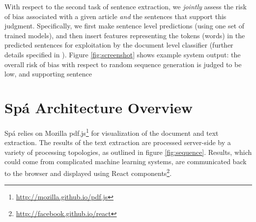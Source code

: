 \documentclass[runningheads,a4paper]{llncs}
\begin{document}
With respect to the second task of sentence extraction, we \emph{jointly} assess the risk of bias associated with a given article \emph{and} the sentences that support this judgment.
Specifically, we first make sentence level predictions (using one set of trained models), and then insert features representing the tokens (words) in the predicted sentences for exploitation by the document level classifier (further details specified in \cite{marshall2014}).
Figure \ref{fig:screenshot} shows example system output: the overall risk of bias with respect to random sequence generation is judged to be low, and supporting sentence



\section{Spá Architecture Overview}
Spá relies on Mozilla pdf.js\footnote{\url{http://mozilla.github.io/pdf.js}} for visualization of the document and text extraction.
The results of the text extraction are processed server-side by a variety of processing topologies, as outlined in figure \ref{fig:sequence}.
Results, which could come from complicated machine learning systems, are communicated back to the browser and displayed using React components\footnote{\url{http://facebook.github.io/react}}.
\end{document}
